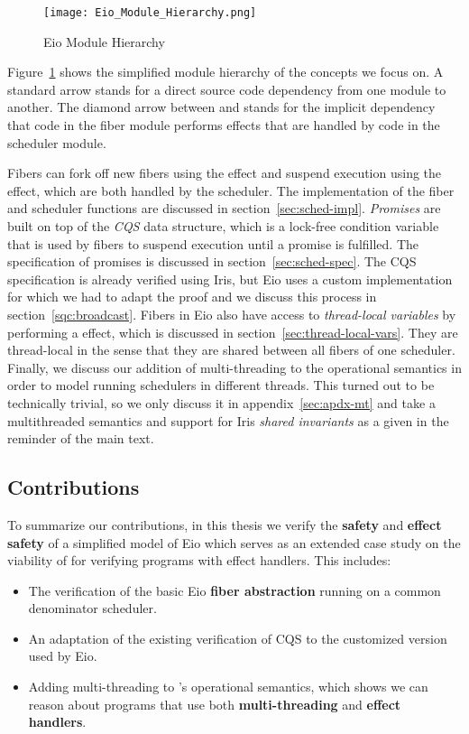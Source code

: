 \begin{figure}[ht]
  \centering
  \texttt{[image: Eio\_Module\_Hierarchy.png]}
  \caption{Eio Module Hierarchy}
  \label{fig:eio-module-hierarchy}
\end{figure}

Figure~\ref{fig:eio-module-hierarchy} shows the simplified module hierarchy of the concepts we focus on.
A standard arrow stands for a direct source code dependency from one module to another.
The diamond arrow between  and  stands for the implicit dependency that code in the fiber module performs effects that are handled by code in the scheduler module.

Fibers can fork off new fibers using the \efork{} effect and suspend execution using the \esuspend{} effect, which are both handled by the scheduler.
The implementation of the fiber and scheduler functions are discussed in section~\ref{sec:sched-impl}.
\emph{Promises} are built on top of the \emph{CQS} data structure, which is a lock-free condition variable that is used by fibers to suspend execution until a promise is fulfilled.
The specification of promises is discussed in section~\ref{sec:sched-spec}.
The CQS specification is already verified using Iris, but Eio uses a custom implementation for which we had to adapt the proof and we discuss this process in section~\ref{sqc:broadcast}.
Fibers in Eio also have access to \emph{thread-local variables} by performing a \egetctx{} effect, which is discussed in section~\ref{sec:thread-local-vars}.
They are thread-local in the sense that they are shared between all fibers of one scheduler.
Finally, we discuss our addition of multi-threading to the \hazel{} operational semantics in order to model running schedulers in different threads.
This turned out to be technically trivial, so we only discuss it in appendix~\ref{sec:apdx-mt} and take a multithreaded semantics and support for Iris \emph{shared invariants} as a given in the reminder of the main text.

\subsection{Contributions}
\label{sec:intro-contributions}

To summarize our contributions, in this thesis we verify the \textbf{safety} and \textbf{effect safety} of a simplified model of Eio which serves as an extended case study on the viability of \hazel{} for verifying programs with effect handlers.
This includes:

\begin{itemize}
  \item The verification of the basic Eio \textbf{fiber abstraction} running on a common denominator scheduler.
  \item An adaptation of the existing verification of CQS to the customized version used by Eio.
  \item Adding multi-threading to \hazel{}'s operational semantics, which shows we can reason about programs that use both \textbf{multi-threading} and \textbf{effect handlers}.
\end{itemize}
